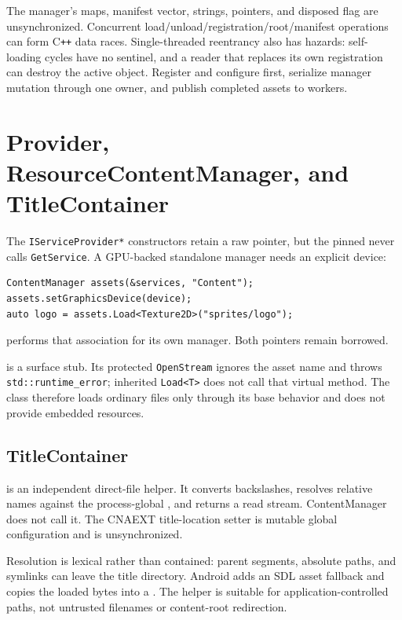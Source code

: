 The manager's maps, manifest vector, strings, pointers, and disposed flag are unsynchronized.
Concurrent load/unload/registration/root/manifest operations can form C\texttt{++} data races.
Single-threaded reentrancy also has hazards: self-loading cycles have no sentinel, and a reader
that replaces its own registration can destroy the active object. Register and configure first,
serialize manager mutation through one owner, and publish completed assets to workers.

\section{Provider, ResourceContentManager, and TitleContainer}

The \texttt{IServiceProvider*} constructors retain a raw pointer, but the pinned
 never calls \texttt{GetService}. A GPU-backed standalone manager needs
an explicit device:

\begin{lstlisting}
ContentManager assets(&services, "Content");
assets.setGraphicsDevice(device);
auto logo = assets.Load<Texture2D>("sprites/logo");
\end{lstlisting}

 performs that association for its own manager. Both pointers remain borrowed.

 is a surface stub. Its protected \texttt{OpenStream} ignores
the asset name and throws \texttt{std::runtime\_error}; inherited \texttt{Load<T>} does not call
that virtual method. The class therefore loads ordinary files only through its base behavior and
does not provide embedded resources.

\subsection{TitleContainer}
\label{sec:title-container-contract}

 is an independent direct-file helper. It converts
backslashes, resolves relative names against the process-global , and
returns a read stream. ContentManager does not call it. The CNAEXT title-location setter is
mutable global configuration and is unsynchronized.

Resolution is lexical rather than contained: parent segments, absolute paths, and symlinks can
leave the title directory. Android adds an SDL asset fallback and copies the loaded bytes into a
. The helper is suitable for application-controlled paths, not untrusted
filenames or content-root redirection.

